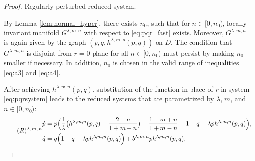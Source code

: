 \documentclass[a4paper,11pt]{article}
\begin{document}
\smallskip
\noindent
\begin{proof}
\medskip {} 
 Regularly perturbed reduced system.
\medskip

By Lemma \ref{lem:normal_hyper}, there exists $n_0$, such that for $n \in [0, n_0)$, locally invariant manifold $G^{\lambda,m,n}$ with respect to \eqref{eq:pqr_fast} exists. Moreover,   $G^{\lambda,m,n}$ is again given by the graph $(p,q,h^{\lambda,m,n}(p,q))$ on $\bar{D}$. The condition that $G^{\lambda,m,n}$ is disjoint from $r=0$ plane for all $n \in [0, n_0)$ must persist by making $n_0$ smaller if necessary. In addition, $n_0$ is chosen in the valid range of inequalities \eqref{eq:a3} and \eqref{eq:a4}.%

After achieving $h^{\lambda,m,n}(p,q)$, substitution of the function in place of $r$ in system \eqref{eq:pqrsystem} leads to  the reduced systems that are parametrized by $\lambda$, $m$, and $n\in[0,n_0)$:
{\small
\begin{equation} \tag*{(${R}$)\textsuperscript{$\lambda,m,n$}} \label{eq:reduced}
\begin{split}
 \dot{p} &=p\Big(\frac{1}{ \lambda }\big(h^{\lambda,m,n}(p,q) - \frac{2-n}{1+m-n}\big) - \frac{1-m+n}{1+m-n} + 1-q- \lambda p h^{\lambda,m,n}(p,q)\Big),\\
 \dot{q} &=q\Big(                                                                          1-q- \lambda p h^{\lambda,m,n}(p,q)\Big) + b^{\lambda,m,n}ph^{\lambda,m,n}(p,q),
\end{split}
\end{equation}
}


\end{proof}
\end{document}
